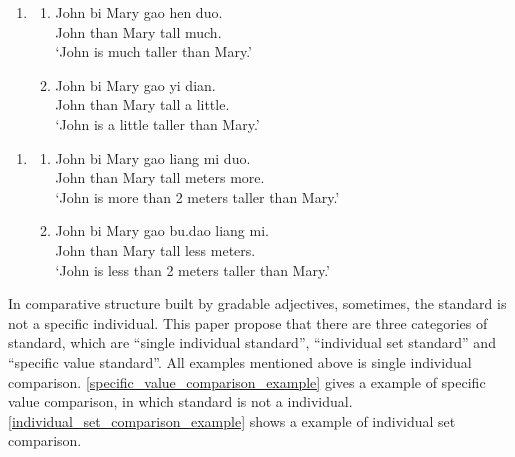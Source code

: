 \documentclass{ctexart}
\begin{document}
\begin{enumerate}
    \item
    \begin{enumerate}
        \item \label{dp_big_vague_example}
        John \enspace bi \enspace Mary \enspace gao \enspace hen duo.\\
        John than Mary \enspace tall \enspace \enspace much. \\
        `John is much taller than Mary.'

        \item \label{dp_small_vague_example}
        John \enspace bi \enspace Mary \enspace gao \enspace yi dian.\\
        John than Mary \enspace tall \enspace a little.\\
        `John is a little taller than Mary.'

    \end{enumerate}
\end{enumerate}

\begin{enumerate}
    \item
    \begin{enumerate}
        \item \label{dp_value_big_vague_example}
        John \enspace bi \enspace Mary \enspace gao \enspace liang mi \enspace \enspace duo.\\
        John than Mary \enspace tall  meters \enspace more. \\
        `John is more than 2 meters taller than Mary.'

        \item \label{dp_value_small_vague_example}
        John \enspace bi \enspace Mary \enspace gao \enspace bu.dao \enspace liang mi.\\
        John than Mary \enspace tall \enspace \enspace less \enspace \enspace {} meters. \\
        `John is less than 2 meters taller than Mary.'
    \end{enumerate}
\end{enumerate}

In comparative structure built by gradable adjectives, sometimes, the standard is not a specific individual. This paper propose that there are three categories of standard, which are ``single individual standard'', ``individual set standard'' and ``specific value standard''. All examples mentioned above is single individual comparison. \ref{specific_value_comparison_example} gives a example of specific value comparison, in which standard is not a individual. \ref{individual_set_comparison_example} shows a example of individual set comparison.
\end{document}
